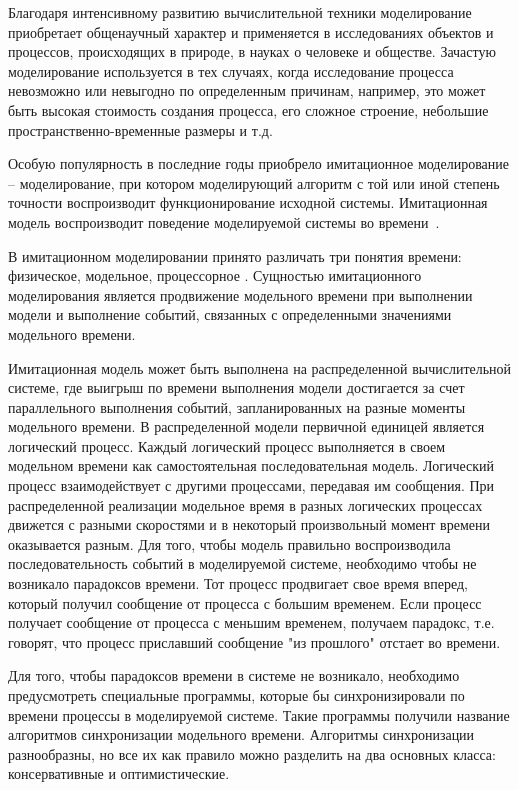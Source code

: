 
{\actuality} 
Благодаря интенсивному развитию вычислительной техники моделирование приобретает общенаучный характер и применяется в исследованиях объектов и процессов, происходящих в природе, в науках о человеке и обществе. Зачастую моделирование используется в тех случаях, когда исследование процесса невозможно или невыгодно по определенным причинам, например, это может быть высокая стоимость создания процесса, его сложное строение, небольшие пространственно-временные размеры и т.д.

Особую популярность в последние годы приобрело имитационное моделирование -- моделирование, при котором моделирующий алгоритм с той или иной степень точности воспроизводит функционирование исходной системы. Имитационная модель воспроизводит поведение моделируемой системы во времени~\cite{disksobmod}.

В имитационном моделировании принято различать три понятия времени: физическое, модельное, процессорное \cite{voz-disser}. Сущностью имитационного моделирования является продвижение модельного времени при выполнении модели и выполнение событий, связанных с определенными значениями модельного времени.

Имитационная модель может быть выполнена на распределенной вычислительной системе, где выигрыш по времени выполнения модели достигается за счет параллельного выполнения событий, запланированных на разные моменты модельного времени. В распределенной модели первичной единицей является логический процесс. Каждый логический процесс выполняется в своем модельном времени как самостоятельная последовательная модель. Логический процесс взаимодействует с другими процессами, передавая им сообщения. При распределенной реализации модельное время в разных логических процессах движется с разными скоростями и в некоторый произвольный момент времени оказывается разным. Для того, чтобы модель правильно воспроизводила последовательность событий в моделируемой системе, необходимо чтобы не возникало парадоксов времени. Тот процесс продвигает свое время вперед, который получил сообщение от процесса с большим временем. Если процесс получает сообщение от процесса с меньшим временем, получаем парадокс, т.е. говорят, что процесс приславший сообщение "из прошлого" отстает во времени.

Для того, чтобы парадоксов времени в системе не возникало, необходимо предусмотреть специальные программы, которые бы синхронизировали по времени процессы в моделируемой системе. Такие программы получили название алгоритмов синхронизации модельного времени. Алгоритмы синхронизации разнообразны, но все их как правило можно разделить на два основных класса: консервативные и оптимистические.

